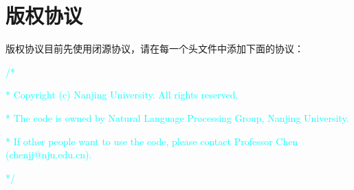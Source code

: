 
\chapter{版权协议}
\label{chap04}

版权协议目前先使用闭源协议，请在每一个头文件中添加下面的协议：

\textcolor{cyan}{/*} 

\textcolor{cyan}{ * Copyright (c)  Nanjing University. All rights reserved.}

\textcolor{cyan}{ * The code is owned by Natural Language Processing Group, Nanjing University.}

\textcolor{cyan}{ * If other people want to use the code, please contact Professor Chen (chenjj@nju.edu.cn).}

\textcolor{cyan}{*/}
